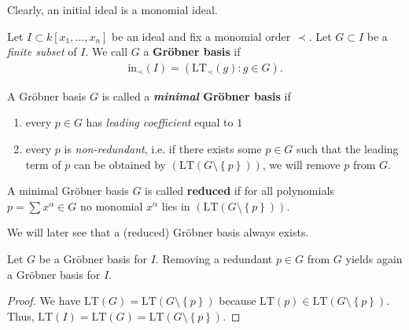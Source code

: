 \documentclass[a4paper, 11pt]{article}
\begin{document}
Clearly, an initial ideal is a monomial ideal.

\begin{mdframed}
\begin{defi}
  Let \( I  \subset k[x_1,\dots,x_n]  \) be an ideal and fix a monomial order \( \prec \).
  Let \( G \subset I \) be a \emph{finite subset} of \( I \). We call \( G \) a \textbf{Gröbner basis} if 
  \begin{align*}
    \mathrm{in}_\prec(I) = (\mathrm{LT}_\prec(g) : g \in G).
  \end{align*}
\end{defi}
\end{mdframed}

\begin{defi}
  A Gröbner basis \( G \) is called a \textbf{\emph{minimal} Gröbner basis} if
  \begin{enumerate}
    \item every \( p \in G \) has \emph{leading coefficient} equal to \( 1 \)
    \item every \( p \) is \emph{non-redundant}, i.e. if there exists some \( p \in G \) such that the leading term of \( p \) can be obtained by \( (\mathrm{LT}(G \setminus \left\{ p \right\})) \), we will remove \( p \) from \( G \).
  \end{enumerate}
\end{defi}

\begin{defi}
  A minimal Gröbner basis \( G \) is called {\textbf{reduced}} if for all polynomials \( p = \sum x^\alpha \in G \) no monomial \( x^\alpha \) lies in \( (\mathrm{LT}(G \setminus \left\{ p \right\})) \).
\end{defi}

We will later see that a (reduced) Gröbner basis always exists.

\begin{lemma}
  Let \( G \) be a Gröbner basis for \( I \). Removing a redundant \( p \in G \) from \( G \) yields again a Gröbner basis for \( I \).
\end{lemma}

\begin{proof}
  We have \( \mathrm{LT}(G) = \mathrm{LT}(G \setminus \left\{ p \right\}) \) because \( \mathrm{LT}(p) \in  \mathrm{LT}(G \setminus \left\{ p \right\})\). Thus, \( \mathrm{LT}(I) = \mathrm{LT}(G) = \mathrm{LT} (G \setminus \left\{ p \right\})\).
\end{proof}
\end{document}
